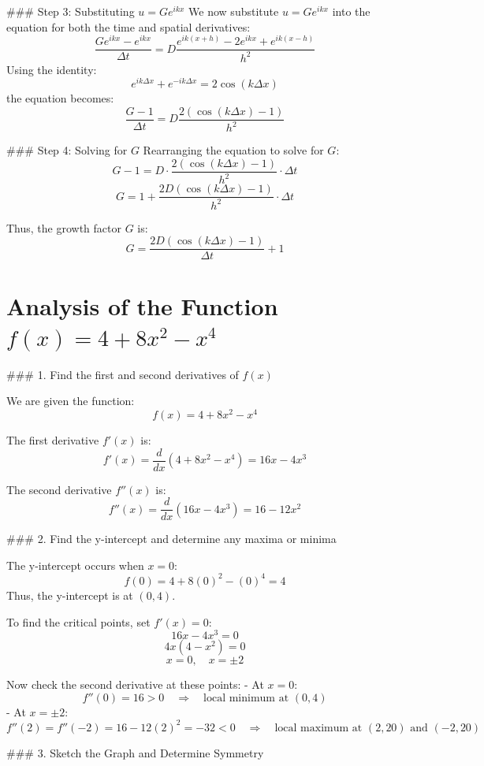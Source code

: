 \documentclass[11pt]{article}
\begin{document}
### Step 3: Substituting \( u = G e^{ikx} \)
We now substitute \( u = G e^{ikx} \) into the equation for both the time and spatial derivatives:
\[
\frac{G e^{ikx} - e^{ikx}}{\Delta t} = D \frac{e^{ik(x+h)} - 2 e^{ikx} + e^{ik(x-h)}}{h^2}
\]
Using the identity:
\[
e^{ik\Delta x} + e^{-ik\Delta x} = 2 \cos(k\Delta x)
\]
the equation becomes:
\[
\frac{G - 1}{\Delta t} = D \frac{2 (\cos(k\Delta x) - 1)}{h^2}
\]

### Step 4: Solving for \( G \)
Rearranging the equation to solve for \( G \):
\[
G - 1 = D \cdot \frac{2 (\cos(k\Delta x) - 1)}{h^2} \cdot \Delta t
\]
\[
G = 1 + \frac{2D(\cos(k\Delta x) - 1)}{h^2} \cdot \Delta t
\]

Thus, the growth factor \( G \) is:
\[
\boxed{G = \frac{2D (\cos(k \Delta x) - 1)}{\Delta t} + 1}
\]
\section{Analysis of the Function \( f(x) = 4 + 8x^2 - x^4 \)}

### 1. Find the first and second derivatives of \( f(x) \)

We are given the function:
\[
f(x) = 4 + 8x^2 - x^4
\]

The first derivative \( f'(x) \) is:
\[
f'(x) = \frac{d}{dx}(4 + 8x^2 - x^4) = 16x - 4x^3
\]

The second derivative \( f''(x) \) is:
\[
f''(x) = \frac{d}{dx}(16x - 4x^3) = 16 - 12x^2
\]

### 2. Find the y-intercept and determine any maxima or minima

The y-intercept occurs when \( x = 0 \):
\[
f(0) = 4 + 8(0)^2 - (0)^4 = 4
\]
Thus, the y-intercept is at \( (0, 4) \).

To find the critical points, set \( f'(x) = 0 \):
\[
16x - 4x^3 = 0
\]
\[
4x(4 - x^2) = 0
\]
\[
x = 0, \quad x = \pm 2
\]

Now check the second derivative at these points:
- At \( x = 0 \):
  \[
  f''(0) = 16 > 0 \quad \Rightarrow \quad \text{local minimum at } (0, 4)
  \]
- At \( x = \pm 2 \):
  \[
  f''(2) = f''(-2) = 16 - 12(2)^2 = -32 < 0 \quad \Rightarrow \quad \text{local maximum at } (2, 20) \text{ and } (-2, 20)
  \]

### 3. Sketch the Graph and Determine Symmetry
\end{document}
